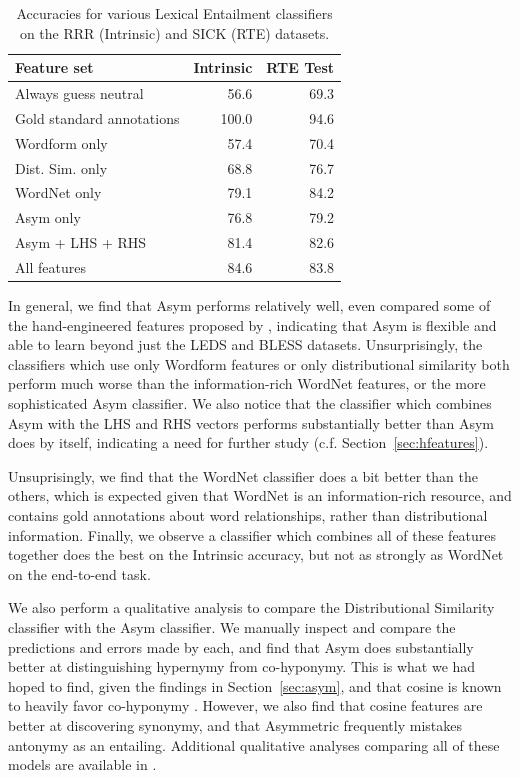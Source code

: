 \documentclass[12pt]{article}
\begin{document}
\begin{table}
\centering
\begin{tabular}{|lrr|}
    \hline
    {\bf Feature set} & {\bf Intrinsic} & {\bf RTE Test}\\
    \hline
    Always guess neutral & 56.6 & 69.3 \\
    Gold standard annotations&100.0 & 94.6 \\
    \hline
    Wordform only        & 57.4 & 70.4 \\
    Dist. Sim. only      & 68.8 & 76.7 \\
    WordNet only         & 79.1 & 84.2 \\
    Asym only            & 76.8 & 79.2 \\
    Asym + LHS + RHS     & 81.4 & 82.6 \\
    \hline
    All features         & 84.6 & 83.8 \\
    \hline
\end{tabular}
\caption{Accuracies for various Lexical Entailment classifiers on the RRR (Intrinsic) and SICK (RTE) datasets.}
\label{tab:evallexical}
\end{table}

In general, we find that Asym performs relatively well, even compared some of
the hand-engineered features proposed by , indicating
that Asym is flexible and able to learn beyond just the LEDS and BLESS datasets.
Unsurprisingly, the classifiers which use only Wordform features or only
distributional similarity both perform much worse than the information-rich
WordNet features, or the more sophisticated Asym classifier.
We also notice that the classifier which combines Asym with the LHS and RHS
vectors performs substantially better than Asym does by itself, indicating
a need for further study (c.f. Section~\ref{sec:hfeatures}).

Unsuprisingly, we find that the WordNet classifier does a bit better than the
others, which is expected given that WordNet is an information-rich resource,
and contains gold annotations about word relationships, rather than
distributional information.  Finally, we observe a classifier which combines
all of these features together does the best on the Intrinsic accuracy, but not
as strongly as WordNet on the end-to-end task.

We also perform a qualitative analysis to compare the Distributional Similarity
classifier with the Asym classifier. We manually inspect and compare the
predictions and errors made by each, and find that Asym does substantially
better at distinguishing hypernymy from co-hyponymy.  This is what we had hoped
to find, given the findings in Section~\ref{sec:asym}, and that cosine is known
to heavily favor co-hyponymy \cite{baroni:2011:gems}.  However, we also find
that cosine features are better at discovering synonymy, and that Asymmetric
frequently mistakes antonymy as an entailing. Additional qualitative analyses comparing
all of these models are available in .
\end{document}
